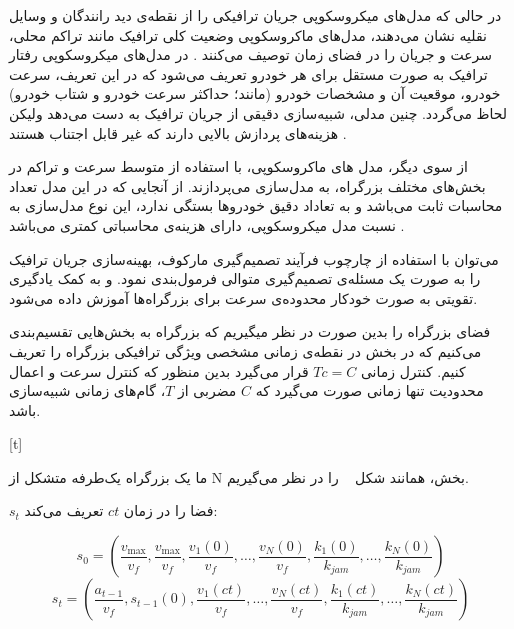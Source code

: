 در حالی که مدل‌های میکروسکوپی جریان ترافیکی را از نقطه‌ی دید رانندگان و وسایل نقلیه نشان می‌دهند، مدل‌های ماکروسکوپی وضعیت کلی ترافیک  مانند تراکم محلی، سرعت و جریان را در فضای زمان توصیف می‌کنند \cite{Treiber2013}.
در مدل‌های میکروسکوپی رفتار ترافیک به صورت مستقل برای هر خودرو تعریف می‌شود که در این تعریف، سرعت خودرو، موقعیت آن و مشخصات خودرو (مانند؛ حداکثر سرعت خودرو و شتاب خودرو) لحاظ می‌گردد. چنین مدلی، شبیه‌سازی دقیقی از جریان ترافیک به دست می‌دهد ولیکن هزینه‌های پردازش بالایی دارند که غیر قابل اجتناب هستند \cite{Walraven2016}.

از سوی دیگر، مدل های ماکروسکوپی، با استفاده از متوسط سرعت و تراکم در بخش‌های مختلف بزرگراه، به مدل‌سازی می‌پردازند.
از آنجایی که در این مدل تعداد محاسبات ثابت می‌باشد و به تعاداد دقیق خودروها بستگی ندارد، این نوع مدل‌سازی به نسبت مدل میکروسکوپی، دارای هزینه‌ی محاسباتی کمتری می‌باشد \cite{Walraven2016}.
%

می‌توان با استفاده از چارچوب فرآیند تصمیم‌گیری مارکوف، بهینه‌سازی جریان ترافیک را به صورت یک مسئله‌ی تصمیم‌گیری متوالی فرمول‌بندی نمود. و به کمک یادگیری تقویتی به صورت خودکار محدوده‌ی سرعت برای بزرگراه‌ها آموزش داده می‌شود.

فضای بزرگراه را بدین صورت در نظر میگیریم که بزرگراه به بخش‌هایی تقسیم‌بندی می‌کنیم که در بخش در نقطه‌ی زمانی مشخصی ویژگی ترافیکی بزرگراه را تعریف کنیم. کنترل زمانی $Tc =C$ قرار می‌گیرد بدین منظور که کنترل سرعت و اعمال محدودیت تنها زمانی صورت می‌گیرد که $C$ مضربی از $T$، گام‌های زمانی شبیه‌سازی باشد.

[t]

ما یک بزرگراه یک‌طرفه متشکل از N بخش، همانند شکل ~ را در نظر می‌گیریم.

$s_{t}$ فضا را در زمان $ct$ تعریف می‌کند:

$$
s _ { 0 } = \left( \frac { v _ { \max } } { v _ { f } } , \frac { v _ { \max } } { v _ { f } } , \frac { v _ { 1 } ( 0 ) } { v _ { f } } , \dots , \frac { v _ { N } ( 0 ) } { v _ { f } } , \frac { k _ { 1 } ( 0 ) } { k _ { j a m } } , \dots , \frac { k _ { N } ( 0 ) } { k _ { j a m } } \right)
$$
$$
s _ { t } = \left( \frac { a _ { t - 1 } } { v _ { f } } , s _ { t - 1 } ( 0 ) , \frac { v _ { 1 } ( c t ) } { v _ { f } } , \dots , \frac { v _ { N } ( c t ) } { v _ { f } } , \frac { k _ { 1 } ( c t ) } { k _ { j a m } } , \dots , \frac { k _ { N } ( c t ) } { k _ { j a m } } \right)
$$

